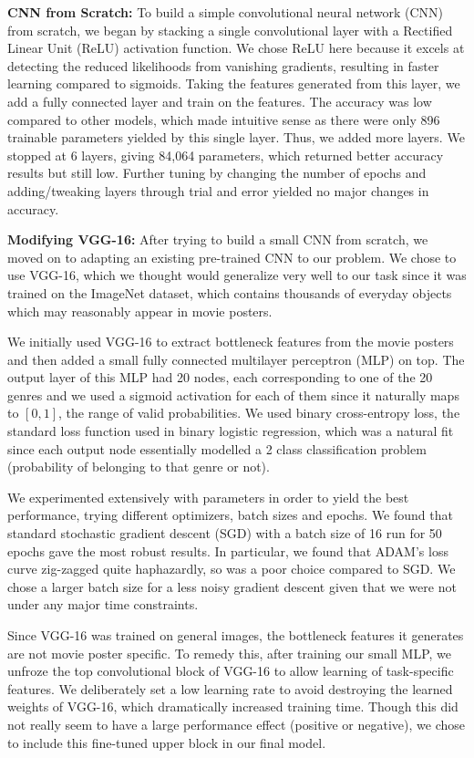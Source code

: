 \documentclass{article}
\begin{document}
        \textbf{CNN from Scratch:} To build a simple convolutional neural network (CNN) from scratch, we began by stacking a single convolutional layer with a Rectified Linear Unit (ReLU) activation function. We chose ReLU here because it excels at detecting the reduced likelihoods from vanishing gradients, resulting in faster learning compared to sigmoids.
        Taking the features generated from this layer, we add a fully connected layer and train on the features. The accuracy was low compared to other models, which made intuitive sense as there were only 896 trainable parameters yielded by this single layer. Thus, we added more layers. We stopped at 6 layers, giving 84,064 parameters, which returned better accuracy results but still low. Further tuning by changing the number of epochs and adding/tweaking layers through trial and error yielded no major changes in accuracy.
        
        \textbf{Modifying VGG-16:} After trying to build a small CNN from scratch, we moved on to adapting an existing pre-trained CNN to our problem. We chose to use VGG-16, which we thought would generalize very well to our task since it was trained on the ImageNet dataset, which contains thousands of everyday objects which may reasonably appear in movie posters.
        
        We initially used VGG-16 to extract bottleneck features from the movie posters and then added a small fully connected multilayer perceptron (MLP) on top. The output layer of this MLP had 20 nodes, each corresponding to one of the 20 genres and we used a sigmoid activation for each of them since it naturally maps to $[0,1]$, the range of valid probabilities. We used binary cross-entropy loss, the standard loss function used in binary logistic regression, which was a natural fit since each output node essentially modelled a 2 class classification problem (probability of belonging to that genre or not).
        
        We experimented extensively with parameters in order to yield the best performance, trying different optimizers, batch sizes and epochs. We found that standard stochastic gradient descent (SGD) with a batch size of 16 run for 50 epochs gave the most robust results. In particular, we found that ADAM's loss curve zig-zagged quite haphazardly, so was a poor choice compared to SGD. We chose a larger batch size for a less noisy gradient descent given that we were not under any major time constraints. 

        
        Since VGG-16 was trained on general images, the bottleneck features it generates are not movie poster specific. To remedy this, after training our small MLP, we unfroze the top convolutional block of VGG-16 to allow learning of task-specific features. We deliberately set a low learning rate to avoid destroying the learned weights of VGG-16, which dramatically increased training time. Though this did not really seem to have a large performance effect (positive or negative), we chose to include this fine-tuned upper block in our final model. 
        
\end{document}

